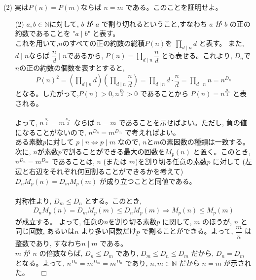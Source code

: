 (2) 実は$P(n)=P(m)$ならば $n=m$ である。このことを証明せよ。
\enthm
\begin{enumerate}
\item[(2)] $a,b\in\mathbb{N}$に対して, $b$ が $a$ で割り切れるということ,すなわち $a$ が $b$ の正の約数であることを "$a\mid b$" と表す。\\
これを用いて,$n$のすべての正の約数の総積$P(n)$を $\displaystyle\prod_{d\mid n}d$ と表す。 また, $d\mid n$ならば $\dfrac{n}{d}\mid n$であるから, $P(n)=\displaystyle\prod_{d\mid n}\dfrac{n}{d}$ とも表せる。これより, $D_n$で$n$の正の約数の個数を表すとすると,
\begin{eqnarray*}
P(n)^2 = \left(\displaystyle\prod_{d\mid n}d\right)\left(\displaystyle\prod_{d\mid n}\dfrac{n}{d}\right) = \displaystyle\prod_{d\mid n}d\cdot \dfrac{n}{d} = \displaystyle\prod_{d\mid n}n = n^{D_n}
\end{eqnarray*}
となる。したがって,$P(n)>0, n^{\frac{D_n}{2}}>0$ であることから $P(n)=n^{\frac{D_n}{2}}$ と表される。\\
\\
よって, $n^{\frac{D_n}{2}}=m^{\frac{D_m}{2}}$ ならば $n=m$ であることを示せばよい。ただし, 負の値になることがないので, $n^{D_n}=m^{D_m}$ で考えればよい。\\
ある素数$p$に対して $p\mid n\Leftrightarrow p\mid m$ なので, $n$と$m$の素因数の種類は一致する。次に, $n$が素数$p$で割ることができる最大の回数を$M_p(n)$ と置く。このとき, $n^{D_n}=m^{D_m}$ であることは, $n$ (または $m$)を割り切る任意の素数$p$ に対して (左辺と右辺をそれぞれ何回割ることができるかを考えて) $D_nM_p(n)=D_mM_p(m)$ が成り立つことと同値である。\\
\\
対称性より, $D_m\le D_n$ とする。このとき,
\begin{eqnarray*} 
D_nM_p(n)=D_mM_p(m)\le D_nM_p(m) \Rightarrow M_p(n)\le M_p(m)
\end{eqnarray*}
が成立する。 よって, 任意の$n$を割り切る素数$p$ に関して, $m$ のほうが, $n$ と同じ回数, あるいは$n$ より多い回数だけ$p$ で割ることができる。よって, $\dfrac{m}{n}$ は整数であり, すなわち$n\mid m$ である。\\
$m$ が $n$ の倍数ならば,  $D_n\le D_m$ であり, $D_m\le D_n\le D_m$ だから, $D_n=D_m$ となる。よって, $n^{D_n}=m^{D_m}=m^{D_n}$ であり, $n,m\in\mathbb{N}$ だから $n=m$ が示された。　　$\Box$
\end{enumerate}